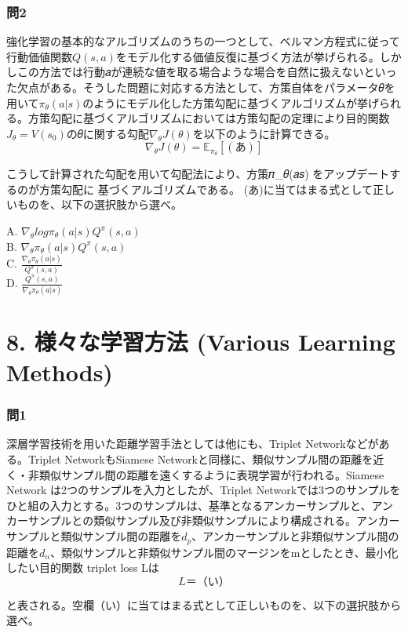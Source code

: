 \documentclass[
  letterpaper,
  DIV=11,
  numbers=noendperiod]{scrreprt}
\begin{document}
\subsection{問2}\label{ux554f2-5}

強化学習の基本的なアルゴリズムのうちの一つとして、ベルマン方程式に従って行動価値関数\(𝑄(𝑠, 𝑎)\)をモデル化する価値反復に基づく方法が挙げられる。しかしこの方法では行動𝑎が連続な値を取る場合ような場合を自然に扱えないといった欠点がある。そうした問題に対応する方法として、方策自体をパラメータ𝜃を用いて\(𝜋_𝜃(𝑎|𝑠)\)のようにモデル化した方策勾配に基づくアルゴリズムが挙げられる。方策勾配に基づくアルゴリズムにおいては方策勾配の定理により目的関数\(𝐽_𝜃 = 𝑉(𝑠_0)\)の𝜃に関する勾配\(∇_𝜃𝐽(𝜃)\)を以下のように計算できる。
\[
∇_𝜃𝐽(𝜃) = 𝔼_{𝜋_𝜃}[(あ)]
\]

こうして計算された勾配を用いて勾配法により、方策𝜋\_𝜃(𝑎\textbar 𝑠)
をアップデートするのが方策勾配に 基づくアルゴリズムである。
(あ)に当てはまる式として正しいものを、以下の選択肢から選べ。

A. \(∇_𝜃log𝜋_𝜃(𝑎|𝑠)𝑄^𝜋(𝑠,𝑎)\)\\
B. \(∇_𝜃𝜋_𝜃(𝑎|𝑠)𝑄^𝜋(𝑠,𝑎)\)\\
C. \(\frac{∇_𝜃𝜋_𝜃(𝑎|𝑠)}{𝑄^𝜋(𝑠,𝑎)}\)\\
D. \(\frac{𝑄^𝜋(𝑠,𝑎)}{∇_𝜃𝜋_𝜃(𝑎|𝑠)}\)

\chapter{8. 様々な学習方法 (Various Learning
Methods)}\label{ux69d8ux3005ux306aux5b66ux7fd2ux65b9ux6cd5-various-learning-methods}

\subsection{問1}\label{ux554f1-9}

深層学習技術を用いた距離学習手法としては他にも、Triplet
Networkなどがある。Triplet NetworkもSiamese
Networkと同様に、類似サンプル間の距離を近く・非類似サンプル間の距離を遠くするように表現学習が行われる。Siamese
Network は2つのサンプルを入力としたが、Triplet
Networkでは3つのサンプルをひと組の入力とする。3つのサンプルは、基準となるアンカーサンプルと、アンカーサンプルとの類似サンプル及び非類似サンプルにより構成される。アンカーサンプルと類似サンプル間の距離を\({d_p}\)、アンカーサンプルと非類似サンプル間の距離を\({d_n}\)、類似サンプルと非類似サンプル間のマージンをmとしたとき、最小化したい目的関数
triplet loss Lは \[
L ＝（い）
\]

と表される。空欄（い）に当てはまる式として正しいものを、以下の選択肢から選べ。
\end{document}
